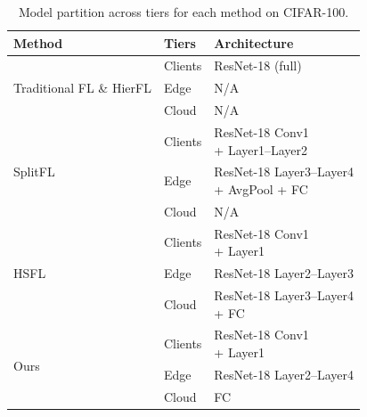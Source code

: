 \documentclass[letterpaper]{article} %
\begin{document}
        \begin{table}
            \centering
            \small
            \begin{tabular}{l|l|l}
            \hline
            \textbf{Method} & \textbf{Tiers} & \textbf{Architecture} \\
            \hline
            \multirow{3}{*}{Traditional FL \& HierFL} 
            & Clients & ResNet-18 (full) \\
            & Edge & N/A \\
            & Cloud & N/A \\
            \hline
            \multirow{3}{*}{SplitFL} 
            & Clients & \makecell[l]{ResNet-18 Conv1 \\ + Layer1--Layer2} \\
            & Edge & \makecell[l]{ResNet-18 Layer3--Layer4 \\ + AvgPool + FC} \\
            & Cloud & N/A \\
            \hline
            \multirow{3}{*}{HSFL} 
            & Clients & \makecell[l]{ResNet-18 Conv1 \\ + Layer1} \\
            & Edge & ResNet-18 Layer2--Layer3 \\
            & Cloud & \makecell[l]{ResNet-18 Layer3--Layer4 \\ + FC} \\
            \hline
            \multirow{3}{*}{Ours} 
            & Clients & \makecell[l]{ResNet-18 Conv1 \\ + Layer1} \\
            & Edge & ResNet-18 Layer2--Layer4 \\
            & Cloud & FC \\ \hline
            \end{tabular}
            \caption{Model partition across tiers for each method on CIFAR-100.}
            \label{tab:model_cifar100}
        \end{table}
        
\end{document}
